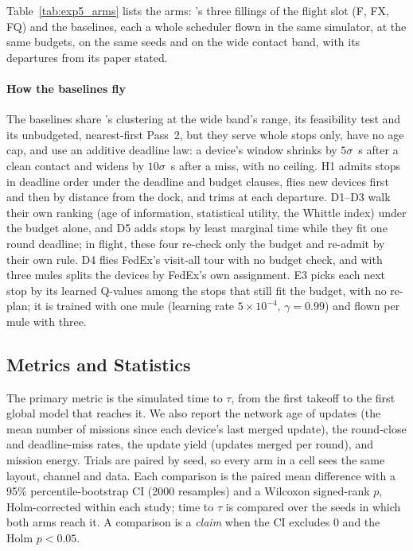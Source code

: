 Table~\ref{tab:exp5_arms} lists the arms: \sysname{}'s three fillings of the
flight slot (F, FX, FQ) and the baselines, each a whole scheduler flown in the
same simulator, at the same budgets, on the same seeds and on the wide contact
band, with its departures from its paper stated.


\paragraph{How the baselines fly}
The baselines share \sysname{}'s clustering at the wide band's range, its
feasibility test and its unbudgeted, nearest-first Pass~2, but they serve whole
stops only, have no age cap, and use an additive deadline law: a device's window
shrinks by $5\sigma$~s after a clean contact and widens by $10\sigma$~s after a
miss, with no ceiling. H1 admits stops in deadline order under the deadline and
budget clauses, flies new devices first and then by distance from the dock, and
trims at each departure. D1--D3 walk their own ranking (age of information,
statistical utility, the Whittle index) under the budget alone, and D5 adds
stops by least marginal time while they fit one round deadline; in flight, these
four re-check only the budget and re-admit by their own rule. D4 flies FedEx's
visit-all tour with no budget check, and with three mules splits the devices by
FedEx's own assignment. E3 picks each next stop by its learned Q-values among the
stops that still fit the budget, with no re-plan; it is trained with one mule
(learning rate $5\times10^{-4}$, $\gamma=0.99$) and flown per mule with three.

\subsection{Metrics and Statistics}
\label{sec:setup:metrics}

The primary metric is the simulated time to $\tau$, from the first takeoff to the
first global model that reaches it. We also report the network age of updates
(the mean number of missions since each device's last merged update), the
round-close and deadline-miss rates, the update yield (updates merged per
round), and mission energy. Trials are paired by seed, so every arm in a cell
sees the same layout, channel and data. Each comparison is the paired mean
difference with a 95\% percentile-bootstrap CI (2000 resamples) and a Wilcoxon
signed-rank $p$, Holm-corrected within each study; time to $\tau$ is compared
over the seeds in which both arms reach it. A comparison is a \emph{claim} when
the CI excludes 0 and the Holm $p<0.05$.

